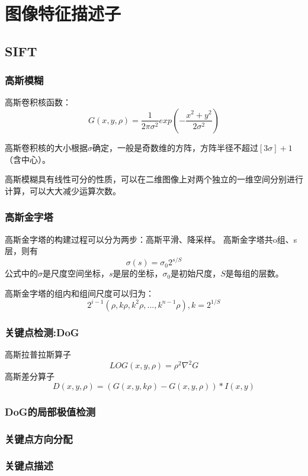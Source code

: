 \section{图像特征描述子}
\subsection{SIFT}
\subsubsection{高斯模糊}
高斯卷积核函数：
\begin{equation}
  G(x,y,\rho)=\frac{1}{2 \pi \sigma^2} exp\left(-\frac{x^2+y^2}{2\sigma^2}\right)
\end{equation}
\par
高斯卷积核的大小根据$\sigma$确定，一般是奇数维的方阵，方阵半径不超过$[3\sigma]+1$（含中心）。
\par 高斯模糊具有线性可分的性质，可以在二维图像上对两个独立的一维空间分别进行计算，可以大大减少运算次数。
\subsubsection{高斯金字塔}
高斯金字塔的构建过程可以分为两步：高斯平滑、降采样。
高斯金字塔共o组、s层，则有
\begin{equation}
  \sigma(s)=\sigma_0 2^{s/S}
\end{equation}
公式中的$\sigma$是尺度空间坐标，$s$是层的坐标，$\sigma_0$是初始尺度，$S$是每组的层数。
\par 高斯金字塔的组内和组间尺度可以归为：
\begin{equation}
  2^{i-1} (\rho,k\rho,k^2\rho,...,k^{n-1}\rho),
  k=2^{1/S}
\end{equation}
\subsubsection{关键点检测:DoG}
高斯拉普拉斯算子
\begin{equation}
  LOG(x,y,\rho)=\rho^2 \nabla^2 G
\end{equation}
高斯差分算子
\begin{equation}
  D(x,y,\rho)=\left(G(x,y,k\rho)-G(x,y,\rho)\right)*I(x,y)
\end{equation}
\subsubsection{DoG的局部极值检测}

\subsubsection{关键点方向分配}

\subsubsection{关键点描述}

